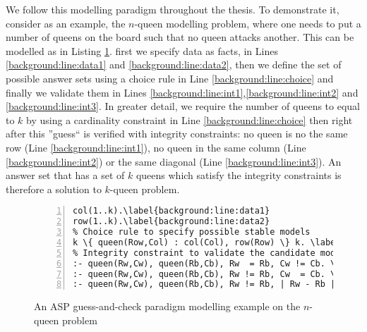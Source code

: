 We follow this modelling paradigm throughout the thesis. To demonstrate it, consider as an example, the $n$-queen modelling problem, where one needs to put a number of queens on the board such that no queen attacks another. This can be modelled as in Listing \ref{lst:n_queens_example_modelling}. first we specify data as facts, in Lines \ref{background:line:data1} and \ref{background:line:data2}, then we define the set of possible answer sets using a choice rule in Line \ref{background:line:choice} and finally we validate them in Lines \ref{background:line:int1},\ref{background:line:int2} and \ref{background:line:int3}. 
\pubrev
In greater detail, we require the number of queens to equal to $k$ by using a cardinality constraint in Line \ref{background:line:choice} then right after this ''guess`` is verified with integrity constraints: no queen is no the same row (Line \ref{background:line:int1}), no queen in the same column (Line \ref{background:line:int2}) or the same diagonal (Line \ref{background:line:int3}). An answer set that has a set of $k$ queens which satisfy the integrity constraints is therefore a solution to $k$-queen problem.
\pubrevend

\begin{figure}[H] 
\renewcommand\figurename{Listing}
\begin{Verbatim}[fontsize=\small,numbers=left,xleftmargin=0mm,commandchars=\\\{\},frame=single]
% Data specifying the board
col(1..k).\label{background:line:data1}
row(1..k).\label{background:line:data2}
% Choice rule to specify possible stable models
k \{ queen(Row,Col) : col(Col), row(Row) \} k. \label{background:line:choice}
% Integrity constraint to validate the candidate models
:- queen(Rw,Cw), queen(Rb,Cb), Rw  = Rb, Cw != Cb. \label{background:line:int1}
:- queen(Rw,Cw), queen(Rb,Cb), Rw != Rb, Cw  = Cb. \label{background:line:int2}
:- queen(Rw,Cw), queen(Rb,Cb), Rw != Rb, | Rw - Rb | = | Cw - Cb |.\label{background:line:int3}
\end{Verbatim}
\caption{An ASP guess-and-check paradigm modelling example on the $n$-queen problem}
\label{lst:n_queens_example_modelling}
\end{figure}


